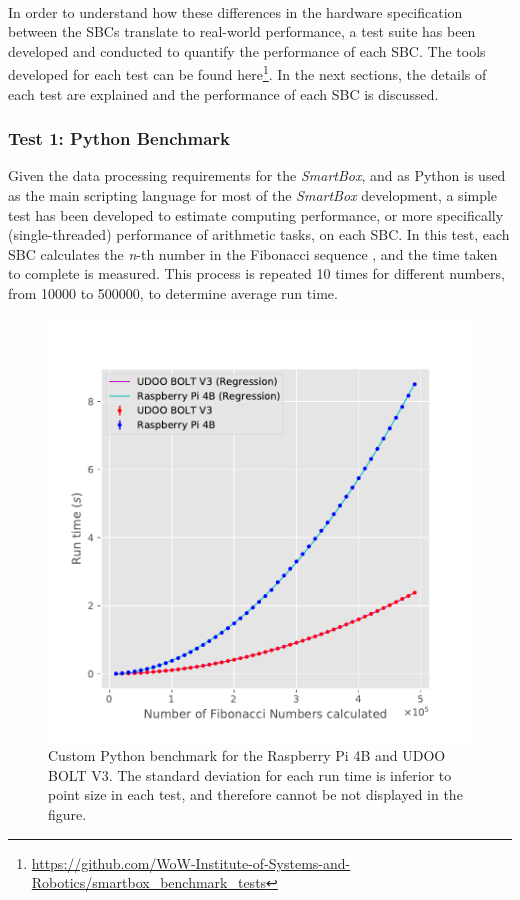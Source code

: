 \paragraph{} In order to understand how these differences in the hardware specification between the \acs{SBC}s translate to real-world performance, a test suite has been developed and conducted to quantify the performance of each \acs{SBC}. The tools developed for each test can be found here\footnote{\url{https://github.com/WoW-Institute-of-Systems-and-Robotics/smartbox\_benchmark\_tests}}. In the next sections, the details of each test are explained and the performance of each \acs{SBC} is discussed. 

\subsubsection{Test 1: Python Benchmark}

Given the data processing requirements for the \textit{SmartBox}, and as Python is used as the main scripting language for most of the \textit{SmartBox} development, a simple test has been developed to estimate computing performance, or more specifically (single-threaded) performance of arithmetic tasks, on each \acs{SBC}. In this test, each \acs{SBC} calculates the \textit{n}-th number in the Fibonacci sequence \cite{pierce1951fibonacci}, and the time taken to complete is measured. This process is repeated 10 times for different numbers, from 10000 to 500000, to determine average run time.

\begin{figure}[H]
    \centering
    \includegraphics[width=0.67 \linewidth]{images/fibonacci-test.pdf}
    \caption [Custom Python benchmark for the Raspberry Pi 4B and UDOO BOLT V3.]{ Custom Python benchmark for the Raspberry Pi 4B and UDOO BOLT V3. The standard deviation for each run time is inferior to point size in each test, and therefore cannot be not displayed in the figure.}
    \label{fig:fibonacci-tests}
\end{figure}

